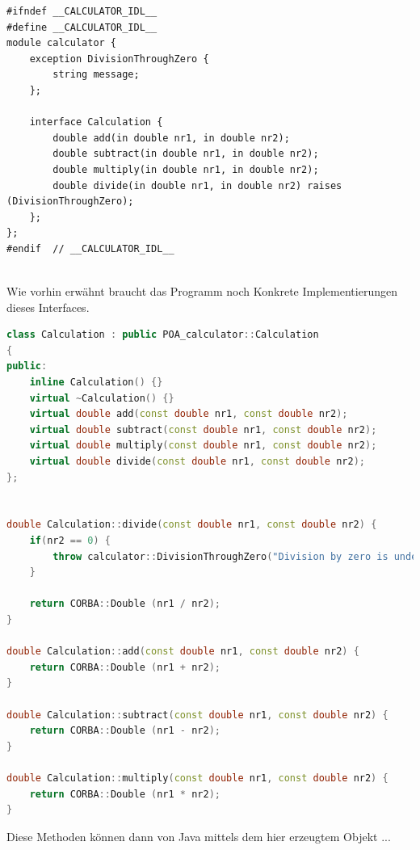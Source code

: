 \begin{lstlisting}[language={[CORBA]IDL}, caption=calculator.idl Interface]
#ifndef __CALCULATOR_IDL__
#define __CALCULATOR_IDL__
module calculator {
	exception DivisionThroughZero {
		string message;
	};

	interface Calculation {
		double add(in double nr1, in double nr2);
		double subtract(in double nr1, in double nr2);
		double multiply(in double nr1, in double nr2);
		double divide(in double nr1, in double nr2) raises (DivisionThroughZero);
	};
};
#endif  // __CALCULATOR_IDL__


\end{lstlisting}

Wie vorhin erw\"ahnt braucht das Programm noch Konkrete Implementierungen dieses Interfaces.

\begin{lstlisting}[language=C++, caption=C++ IDL Implementation]
class Calculation : public POA_calculator::Calculation
{
public:
    inline Calculation() {}
    virtual ~Calculation() {}
    virtual double add(const double nr1, const double nr2);
    virtual double subtract(const double nr1, const double nr2);
    virtual double multiply(const double nr1, const double nr2);
    virtual double divide(const double nr1, const double nr2);
};


double Calculation::divide(const double nr1, const double nr2) {
    if(nr2 == 0) {
        throw calculator::DivisionThroughZero("Division by zero is undefined");
    }

    return CORBA::Double (nr1 / nr2);
}

double Calculation::add(const double nr1, const double nr2) {
    return CORBA::Double (nr1 + nr2);
}

double Calculation::subtract(const double nr1, const double nr2) {
    return CORBA::Double (nr1 - nr2);
}

double Calculation::multiply(const double nr1, const double nr2) {
    return CORBA::Double (nr1 * nr2);
}
\end{lstlisting}

\clearpage

Diese Methoden k\"onnen dann von Java mittels dem hier erzeugtem Objekt ...

